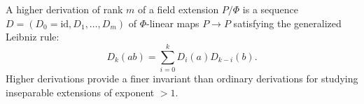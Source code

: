 A higher derivation of rank $m$ of a field extension $P/\Phi$ is a sequence $D = (D_0 = \text{id}, D_1, \ldots, D_m)$ of $\Phi$-linear maps $P \to P$ satisfying the generalized Leibniz rule:
$$D_k(ab) = \sum_{i=0}^{k} D_i(a) D_{k-i}(b).$$
Higher derivations provide a finer invariant than ordinary derivations for studying inseparable extensions of exponent $> 1$.
